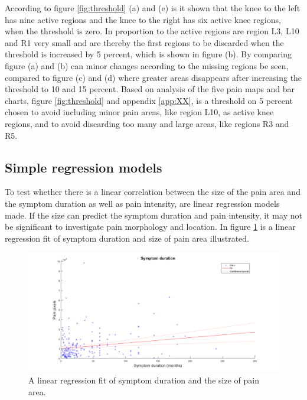 \noindent
According to figure \ref{fig:threshold} (a) and (e) is it shown that the knee to the left has nine active regions and the knee to the right has six active knee regions, when the threshold is zero. In proportion to the active regions are region L3, L10 and R1 very small and are thereby the first regions to be discarded when the threshold is increased by 5 percent, which is shown in figure (b). 
By comparing figure (a) and (b) can minor changes according to the missing regions be seen, compared to figure (c) and (d) where greater areas disappears after increasing the threshold to 10 and 15 percent. 
\noindent
Based on analysis of the five pain maps and bar charts, figure \ref{fig:threshold} and appendix \ref{app:XX}, is a threshold on 5 percent chosen to avoid including minor pain areas, like region L10, as active knee regions, and to avoid discarding too many and large areas, like regions R3 and R5.


\subsection{Simple regression models}
To test whether there is a linear correlation between the size of the pain area and the symptom duration as well as pain intensity, are linear regression models made. If the size can predict the symptom duration and pain intensity, it may not be significant to investigate pain morphology and location.
\noindent
In figure \ref{fig:durationRegression} is a linear regression fit of symptom duration and size of pain area illustrated. 

\begin{figure} [H]
\centering
\includegraphics[width=1\textwidth]{figures/durationRegression}
\caption{A linear regression fit of symptom duration and the size of pain area.}
\label{fig:durationRegression}
\end{figure}

